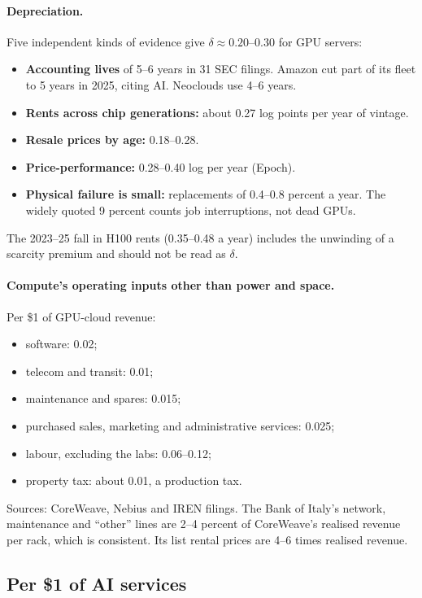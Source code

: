 \paragraph{Depreciation.} Five independent kinds of evidence give $\delta\approx0.20$--$0.30$ for
GPU servers:
\begin{itemize}
  \item \textbf{Accounting lives} of 5--6 years in 31 SEC filings. Amazon cut part of its fleet
    to 5 years in 2025, citing AI. Neoclouds use 4--6 years.
  \item \textbf{Rents across chip generations:} about 0.27 log points per year of vintage.
  \item \textbf{Resale prices by age:} 0.18--0.28.
  \item \textbf{Price-performance:} 0.28--0.40 log per year (Epoch).
  \item \textbf{Physical failure is small:} replacements of 0.4--0.8 percent a year. The widely
    quoted 9 percent counts job interruptions, not dead GPUs.
\end{itemize}
The 2023--25 fall in H100 rents (0.35--0.48 a year) includes the unwinding of a scarcity premium
and should not be read as $\delta$.

\paragraph{Compute's operating inputs other than power and space.} Per \$1 of GPU-cloud revenue:
\begin{itemize}
  \item software: 0.02;
  \item telecom and transit: 0.01;
  \item maintenance and spares: 0.015;
  \item purchased sales, marketing and administrative services: 0.025;
  \item labour, excluding the labs: 0.06--0.12;
  \item property tax: about 0.01, a production tax.
\end{itemize}
Sources: CoreWeave, Nebius and IREN filings. The Bank of Italy's network, maintenance and
``other'' lines are 2--4 percent of CoreWeave's realised revenue per rack, which is consistent.
Its list rental prices are 4--6 times realised revenue.

\subsection{Per \$1 of AI services}\label{sec:perdollar}

